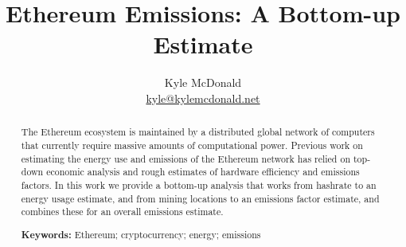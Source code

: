 \documentclass[twocolumn]{article}
\title{Ethereum Emissions: A Bottom-up Estimate \\
}
\author{Kyle McDonald \\ \href{mailto:kyle@kylemcdonald.net}{kyle@kylemcdonald.net}}
\begin{document}
\initcurrdate


\DTLsetseparator{=}
\newcommand{\var}[1]{\DTLfetch{mydata}{thekey}{#1}{thevalue}}

\maketitle

\begin{abstract}
The Ethereum ecosystem is maintained by a distributed global network of computers that currently require massive amounts of computational power. Previous work on estimating the energy use and emissions of the Ethereum network has relied on top-down economic analysis and rough estimates of hardware efficiency and emissions factors. In this work we provide a bottom-up analysis that works from hashrate to an energy usage estimate, and from mining locations to an emissions factor estimate, and combines these for an overall emissions estimate.

\textbf{Keywords:} 
Ethereum; cryptocurrency; energy; emissions
\end{abstract}





\printbibliography
\end{document}
